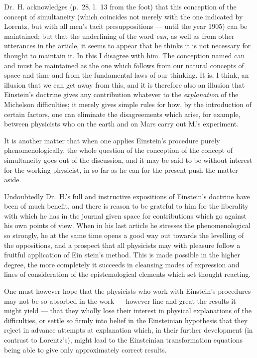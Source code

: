 \documentclass[12pt,a4paper]{article}
\begin{document}
Dr.~H. acknowledges (p.~28, l.~13 from the foot) that this conception of the
concept of simultaneity (which coincides not merely with the one indicated by
Lorentz, but with all men's tacit presuppositions --- until the year 1905) can
be maintained; but that the underlining of the word \emph{can}, as well as
from other utterances in the article, it seems to appear that he thinks it is
not necessary for thought to maintain it. In this I disagree with him. The
conception named can and must be maintained as the one which follows from our
natural concepts of space and time and from the fundamental laws of our
thinking. It is, I think, an illusion that we can get away from this, and it
is therefore also an illusion that Einstein's doctrine gives any contribution
whatever to the \emph{explanation} of the Michelson difficulties; it merely
gives simple rules for how, by the introduction of certain factors, one can
eliminate the disagreements which arise, for example, between physicists who
on the earth and on Mars carry out M.'s experiment.

It is another matter that when one applies Einstein's procedure purely
phenomenologically, the whole question of the conception of the concept of
simultaneity goes out of the discussion, and it may be said to be without
interest for the working physicist, in so far as he can for the present push
the matter aside.

Undoubtedly Dr.~H.'s full and instructive expositions of Einstein's doctrine
have been of much benefit, and there is reason to be grateful to him for the
liberality with which he has in the journal given space for contributions
which go against his own points of view. When in his last article he stresses
the phenomenological so strongly, he at the same time opens a good way out
towards the levelling of the oppositions, and a prospect that all physicists
may with pleasure follow a fruitful application of Ein\-%
stein's method. This is made possible in the higher degree, the more
completely it succeeds in cleansing modes of expression and lines of
consideration of the epistemological elements which set thought reacting.

One must however hope that the physicists who work with Einstein's procedures
may not be so absorbed in the work --- however fine and great the results it
might yield --- that they wholly lose their interest in physical explanations
of the difficulties, or settle so firmly into belief in the Einsteinian
hypothesis that they reject in advance attempts at explanation which, in their
further development (in contrast to Lorentz's), might lead to the Einsteinian
transformation equations being able to give only approximately correct
results.
\end{document}
